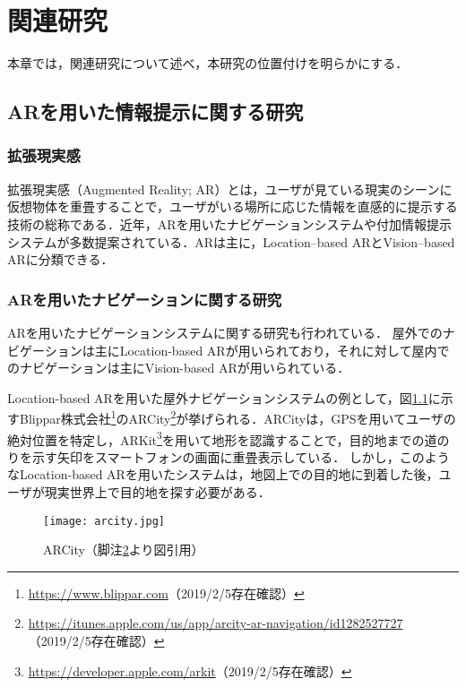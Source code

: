 \chapter{関連研究}
\label{chapter:relatedwork}
本章では，関連研究について述べ，本研究の位置付けを明らかにする．

\section{ARを用いた情報提示に関する研究}
  \subsection{拡張現実感}
    拡張現実感（Augmented Reality; AR）とは，ユーザが見ている現実のシーンに仮想物体を重畳することで，ユーザがいる場所に応じた情報を直感的に提示する技術の総称である\cite{Kambara:2010}．近年，ARを用いたナビゲーションシステムや付加情報提示システムが多数提案されている．ARは主に，Location--based ARとVision--based ARに分類できる\cite{Chatzopoulos:2017}．

  \subsection{ARを用いたナビゲーションに関する研究}
    ARを用いたナビゲーションシステムに関する研究も行われている．
    屋外でのナビゲーションは主にLocation-based ARが用いられており，それに対して屋内でのナビゲーションは主にVision-based ARが用いられている．

    Location-based ARを用いた屋外ナビゲーションシステムの例として，図\ref{figure:arcity}に示すBlippar株式会社\footnote{\url{https://www.blippar.com}（2019/2/5存在確認）}のARCity\footnote{\url{https://itunes.apple.com/us/app/arcity-ar-navigation/id1282527727}\label{footnote:arcity}（2019/2/5存在確認）}が挙げられる．ARCityは，GPSを用いてユーザの絶対位置を特定し，ARKit\footnote{\url{https://developer.apple.com/arkit}（2019/2/5存在確認）}を用いて地形を認識することで，目的地までの道のりを示す矢印をスマートフォンの画面に重畳表示している．
    しかし，このようなLocation-based ARを用いたシステムは，地図上での目的地に到着した後，ユーザが現実世界上で目的地を探す必要がある．
    \begin{figure}[tb]
      \centerline{\texttt{[image: arcity.jpg]}}
      \caption{ARCity（脚注\ref{footnote:arcity}より図引用）}
      \label{figure:arcity}
    \end{figure}

